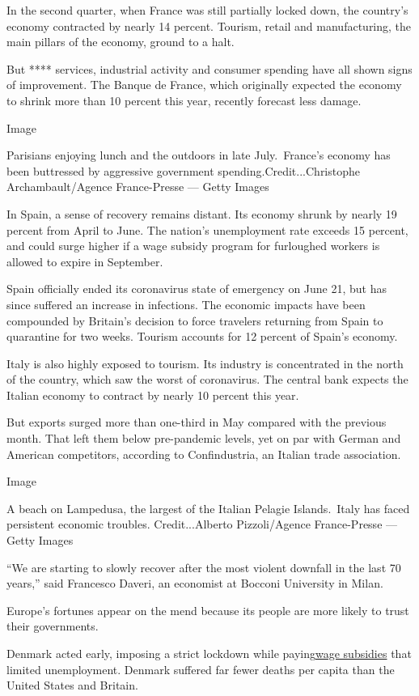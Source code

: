 In the second quarter, when France was still partially locked down, the
country's economy contracted by nearly 14 percent. Tourism, retail and
manufacturing, the main pillars of the economy, ground to a halt.

But **** services, industrial activity and consumer spending have all
shown signs of improvement. The Banque de France, which originally
expected the economy to shrink more than 10 percent this year, recently
forecast less damage.

Image

Parisians enjoying lunch and the outdoors in late July.~France's economy
has been buttressed by aggressive government
spending.Credit...Christophe Archambault/Agence France-Presse --- Getty
Images

In Spain, a sense of recovery remains distant. Its economy shrunk by
nearly 19 percent from April to June. The nation's unemployment rate
exceeds 15 percent, and could surge higher if a wage subsidy program for
furloughed workers is allowed to expire in September.

Spain officially ended its coronavirus state of emergency on June 21,
but has since suffered an increase in infections. The economic impacts
have been compounded by Britain's decision to force travelers returning
from Spain to quarantine for two weeks. Tourism accounts for 12 percent
of Spain's economy.

Italy is also highly exposed to tourism. Its industry is concentrated in
the north of the country, which saw the worst of coronavirus. The
central bank expects the Italian economy to contract by nearly 10
percent this year.

But exports surged more than one-third in May compared with the previous
month. That left them below pre-pandemic levels, yet on par with German
and American competitors, according to Confindustria, an Italian trade
association.

Image

A beach on Lampedusa, the largest of the Italian Pelagie Islands.~Italy
has faced persistent economic troubles. Credit...Alberto Pizzoli/Agence
France-Presse --- Getty Images

``We are starting to slowly recover after the most violent downfall in
the last 70 years,'' said Francesco Daveri, an economist at Bocconi
University in Milan.

Europe's fortunes appear on the mend because its people are more likely
to trust their governments.

Denmark acted early, imposing a strict lockdown while
paying\href{https://www.nytimes3xbfgragh.onion/2020/03/28/business/nordic-way-economic-rescue-virus.html}{wage
subsidies} that limited unemployment. Denmark suffered far fewer deaths
per capita than the United States and Britain.

